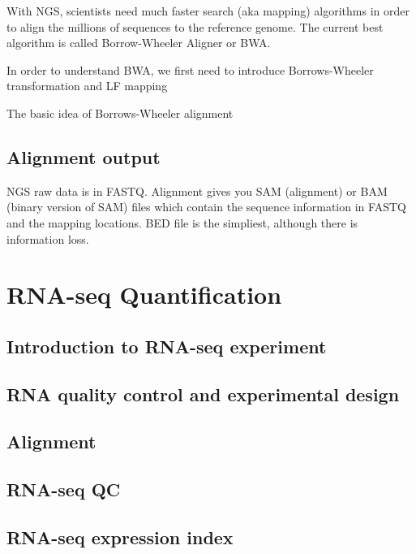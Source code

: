 \documentclass[
]{book}
\begin{document}
With NGS, scientists need much faster search (aka mapping) algorithms in order to align the millions of sequences to the reference genome. The current best algorithm is called Borrow-Wheeler Aligner or BWA.

In order to understand BWA, we first need to introduce Borrows-Wheeler transformation and LF mapping

The basic idea of Borrows-Wheeler alignment

\hypertarget{alignment-output}{%
\section{Alignment output}\label{alignment-output}}

NGS raw data is in FASTQ. Alignment gives you SAM (alignment) or BAM (binary version of SAM) files which contain the sequence information in FASTQ and the mapping locations. BED file is the simpliest, although there is information loss.

\hypertarget{rnaseq}{%
\chapter{RNA-seq Quantification}\label{rnaseq}}

\hypertarget{introduction-to-rna-seq-experiment}{%
\section{Introduction to RNA-seq experiment}\label{introduction-to-rna-seq-experiment}}

\hypertarget{rna-quality-control-and-experimental-design}{%
\section{RNA quality control and experimental design}\label{rna-quality-control-and-experimental-design}}

\hypertarget{alignment}{%
\section{Alignment}\label{alignment}}

\hypertarget{rna-seq-qc}{%
\section{RNA-seq QC}\label{rna-seq-qc}}

\hypertarget{rna-seq-expression-index}{%
\section{RNA-seq expression index}\label{rna-seq-expression-index}}
\end{document}
